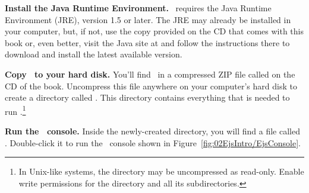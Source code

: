 \begin{numberlist}

\item \textbf{Install the Java Runtime Environment.} \ejs\ requires the Java Runtime Environment (JRE), version 1.5 or later.
The JRE may already be installed in your computer, but, if not, use the copy provided on the CD that
comes with this book or, even better, visit the Java site at  and follow the instructions there
to download and install the latest available version.

\item \textbf{Copy \ejs\ to your hard disk.} You'll find \ejs\ in a compressed ZIP file called  on the CD of the book.
Uncompress this file anywhere on your computer's hard disk to create a directory called . This directory
contains everything that is needed to run \ejs.\footnote{In Unix-like systems, the  directory may be
uncompressed as read-only. Enable write permissions for the  directory and all its subdirectories.}

\item \textbf{Run the \ejs\ console.} Inside the newly-created  directory, you will find a file called
. Double-click it to run the
\ejs\ console shown in Figure~\ref{fig:02EjsIntro/EjsConsole}.


\end{numberlist}
